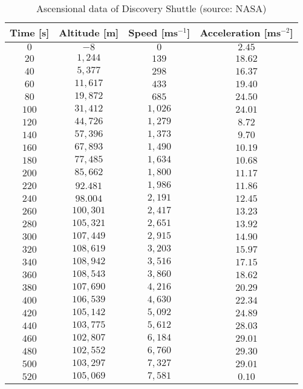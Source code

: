 		\begin{table}[H]\centering
	\begin{center}
			\begin{tabular}{|c|c|c|c|}
				\hline
  \multicolumn{1}{c}{\cellcolor{black!30}\textbf{Time [s]}} & 
  \multicolumn{1}{c}{\cellcolor{black!30}\textbf{Altitude [m]}} & 
  \multicolumn{1}{c}{\cellcolor{black!30}\textbf{Speed [ms$^{-1}$]}} & 
  \multicolumn{1}{c}{\cellcolor{black!30}\textbf{Acceleration [ms$^{-2}$]}}\\ \hline
				$0$ & $-8$ & $0$ & $2.45$\\ \hline
				$20$ & $1,244$ & $139$ & $18.62$\\ \hline
				$40$ & $5,377$ & $298$ & $16.37$\\ \hline
				$60$ & $11,617$ & $433$ & $19.40$\\ \hline
				$80$ & $19,872$ & $685$ & $24.50$\\ \hline
				$100$ & $31,412$ & $1,026$ & $24.01$\\ \hline
				$120$ & $44,726$ & $1,279$ & $8.72$\\ \hline
				$140$ & $57,396$ & $1,373$ & $9.70$\\ \hline
				$160$ & $67,893$ & $1,490$ & $10.19$\\ \hline
				$180$ & $77,485$ & $1,634$ & $10.68$\\ \hline
				$200$ & $85,662$ & $1,800$ & $11.17$\\ \hline
				$220$ & $92.481$ & $1,986$ & $11.86$\\ \hline
				$240$ & $98.004$ & $2,191$ & $12.45$\\ \hline
				$260$ & $100,301$ & $2,417$ & $13.23$\\ \hline
				$280$ & $105,321$ & $2,651$ & $13.92$\\ \hline
				$300$ & $107,449$ & $2,915$ & $14.90$\\ \hline
				$320$ & $108,619$ & $3,203$ & $15.97$\\ \hline
				$340$ & $108,942$ & $3,516$ & $17.15$\\ \hline
				$360$ & $108,543$ & $3,860$ & $18.62$\\ \hline
				$380$ & $107,690$ & $4,216$ & $20.29$\\ \hline
				$400$ & $106,539$ & $4,630$ & $22.34$\\ \hline
				$420$ & $105,142$ & $5,092$ & $24.89$\\ \hline
				$440$ & $103,775$ & $5,612$ & $28.03$\\ \hline
				$460$ & $102,807$ & $6,184$ & $29.01$\\ \hline
				$480$ & $102,552$ & $6,760$ & $29.30$\\ \hline
				$500$ & $103,297$ & $7,327$ & $29.01$\\ \hline
				$520$ & $105,069$ & $7,581$ & $0.10$\\  \hline
 		\end{tabular}
		\end{center}
		\caption[Ascensional data of Discovery Shuttle]{Ascensional data of Discovery Shuttle (source: NASA)}
	\end{table}
	
